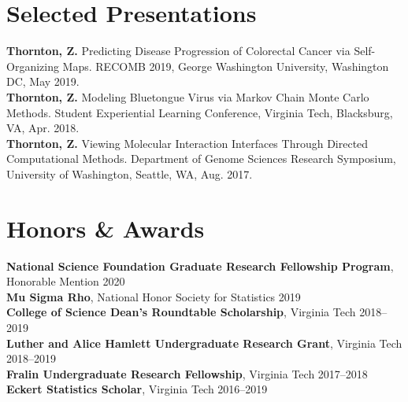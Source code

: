 \documentclass[letterpaper,11pt]{article}
\begin{document}
\section{Selected Presentations}
 \begin{itemize}[leftmargin=0.15in, label={}]
    \small{\item{
    \textbf{Thornton, Z.} Predicting Disease Progression of Colorectal Cancer via Self-Organizing Maps. RECOMB 2019, George Washington University, Washington DC, May 2019. \\
    \textbf{Thornton, Z.} Modeling Bluetongue Virus via Markov Chain Monte Carlo Methods. Student Experiential Learning Conference, Virginia Tech, Blacksburg, VA, Apr. 2018. \\
    \textbf{Thornton, Z.} Viewing Molecular Interaction Interfaces Through Directed Computational Methods. Department of Genome Sciences Research Symposium, University of Washington, Seattle, WA, Aug. 2017.
    }}
 \end{itemize}

\section{Honors \& Awards}
 \begin{itemize}[leftmargin=0.15in, label={}]
    \small{\item{
    \textbf{National Science Foundation Graduate Research Fellowship Program}, Honorable Mention \hfill 2020 \\
    \textbf{Mu Sigma Rho}, National Honor Society for Statistics \hfill 2019 \\
    \textbf{College of Science Dean's Roundtable Scholarship}, Virginia Tech \hfill 2018--2019 \\
    \textbf{Luther and Alice Hamlett Undergraduate Research Grant}, Virginia Tech \hfill 2018--2019 \\
    \textbf{Fralin Undergraduate Research Fellowship}, Virginia Tech \hfill 2017--2018 \\
    \textbf{Eckert Statistics Scholar}, Virginia Tech \hfill 2016--2019
    }}
 \end{itemize}

\end{document}

